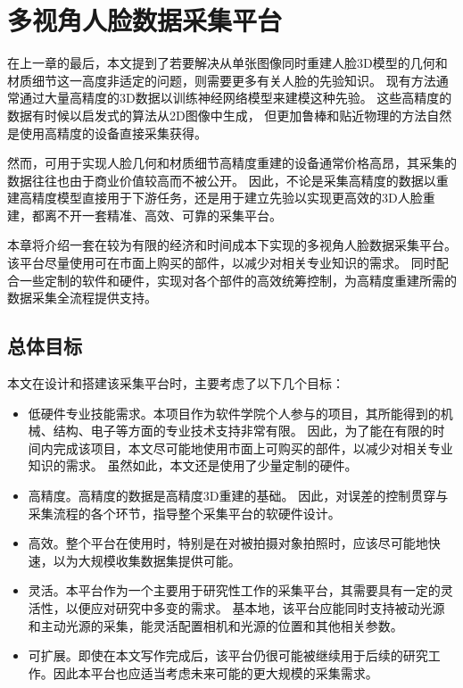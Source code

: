 \chapter{多视角人脸数据采集平台}
\label{chap:platform}

在上一章的最后，本文提到了若要解决从单张图像同时重建人脸3D模型的几何和材质细节这一高度非适定的问题，则需要更多有关人脸的先验知识。
现有方法通常通过大量高精度的3D数据以训练神经网络模型来建模这种先验。
这些高精度的数据有时候以启发式的算法从2D图像中生成，
但更加鲁棒和贴近物理的方法自然是使用高精度的设备直接采集获得。

然而，可用于实现人脸几何和材质细节高精度重建的设备通常价格高昂，其采集的数据往往也由于商业价值较高而不被公开。
因此，不论是采集高精度的数据以重建高精度模型直接用于下游任务，还是用于建立先验以实现更高效的3D人脸重建，都离不开一套精准、高效、可靠的采集平台。

本章将介绍一套在较为有限的经济和时间成本下实现的多视角人脸数据采集平台。
该平台尽量使用可在市面上购买的部件，以减少对相关专业知识的需求。
同时配合一些定制的软件和硬件，实现对各个部件的高效统筹控制，为高精度重建所需的数据采集全流程提供支持。

\section{总体目标}

本文在设计和搭建该采集平台时，主要考虑了以下几个目标：
\begin{itemize}
\item 低硬件专业技能需求。本项目作为软件学院个人参与的项目，其所能得到的机械、结构、电子等方面的专业技术支持非常有限。
因此，为了能在有限的时间内完成该项目，本文尽可能地使用市面上可购买的部件，以减少对相关专业知识的需求。
虽然如此，本文还是使用了少量定制的硬件。

\item 高精度。高精度的数据是高精度3D重建的基础。
因此，对误差的控制贯穿与采集流程的各个环节，指导整个采集平台的软硬件设计。

\item 高效。整个平台在使用时，特别是在对被拍摄对象拍照时，应该尽可能地快速，以为大规模收集数据集提供可能。

\item 灵活。本平台作为一个主要用于研究性工作的采集平台，其需要具有一定的灵活性，以便应对研究中多变的需求。
基本地，该平台应能同时支持被动光源和主动光源的采集，能灵活配置相机和光源的位置和其他相关参数。

\item 可扩展。即使在本文写作完成后，该平台仍很可能被继续用于后续的研究工作。因此本平台也应适当考虑未来可能的更大规模的采集需求。

\end{itemize}

